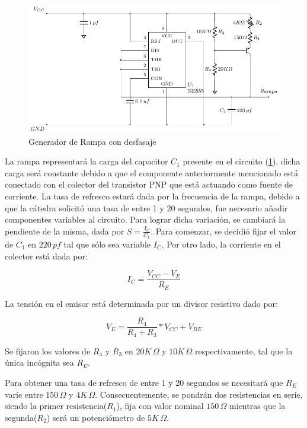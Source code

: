 \begin{figure}[H]
\centering
\includegraphics[scale=0.8]{Ejercicio8/Circuitos/Generador_de_rampa.pdf}
\caption{Generador de Rampa con desfasaje}
\label{fig:Generador_de_rampa}
\end{figure}

La rampa representará la carga del capacitor $C_1$ presente en el circuito (\ref{fig:Generador_de_rampa}), dicha carga será constante debido a que el componente anteriormente mencionado está conectado con el colector del transistor PNP que está actuando como fuente de corriente. La tasa de refresco estará dada por la frecuencia de la rampa, debido a que la cátedra solicitó una tasa de entre 1 y 20 segundos, fue necesario añadir componentes variables al circuito. Para lograr dicha variación, se cambiará la pendiente de la misma, dada por $S=\frac{I_C}{C_1}$. Para comenzar, se decidió fijar el valor de $C_1$ en $220\,pf$ tal que sólo sea variable $I_C$. Por otro lado, la corriente en el colector está dada por:

\begin{equation}
I_C=\frac{V_{CC}-V_E}{R_E}
\end{equation}

La tensión en el emisor está determinada por un divisor resistivo dado por:

\begin{equation}
V_E=\frac{R_4}{R_4+R_3} * V_{CC} + V_{BE}
\end{equation}

Se fijaron los valores de $R_4$ y $R_3$ en $20K\,\Omega$ y $10K\,\Omega$ respectivamente, tal que la única incógnita sea $R_E$. \par
Para obtener una tasa de refresco de entre 1 y 20 segundos se necesitará que $R_E$ varíe entre $150\,\Omega$ y $4K\,\Omega$. Consecuentemente, se pondrán dos resistencias en serie, siendo la primer resistencia($R_1$), fija con valor nominal $150\,\Omega$ mientras que la segunda($R_2$) será un potenciómetro de $5K\,\Omega$.

